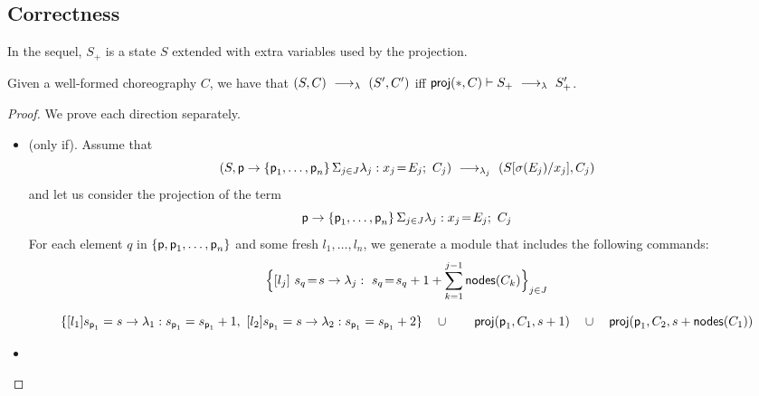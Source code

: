 



\subsection{Correctness}

In the sequel, $S_+$ is a state $S$ extended with extra variables used
by the projection.
\begin{theorem}[EPP]\label{thm:epp}
  Given a well-formed choreography $C$, we have that
  $(S,C) \ \longrightarrow_{\lambda}\  (S', C')$ iff
  $\mathsf{proj} (*, C)\vdash S_+\ \longrightarrow_{\lambda}\  S'_+$.
\end{theorem} 
\begin{proof} We prove each direction separately.
  \begin{itemize}
  \item (only if). Assume that
    $$(S, \textsf{p}\rightarrow \{\textsf{p}_1,\ldots,\textsf{p}_n\}\,\Sigma_{j\in J} \lambda_j: x_j\!=\!E_j;\ C_j)\ \longrightarrow_{\lambda_j}\ (S[\sigma(E_j)/x_j], C_j)$$
    and let us consider the projection of the term
    $$\textsf{p}\rightarrow \{\textsf{p}_1,\ldots,\textsf{p}_n\}\,\Sigma_{j\in J} \lambda_j: x_j\!=\!E_j;\ C_j$$
    For each element $q$ in $\{\textsf{p}, \textsf{p}_1,\ldots,\textsf{p}_n\}$
    and some fresh $l_1,\ldots, l_n$, we generate a module that
    includes the following commands:
    $$
    \Big\{[l_j] \ s_{q}\!=\! s \rightarrow \lambda_j:\ s_{q}\!=\!
      s_{q} +1+\sum_{k=1}^{j-1}\mathsf{nodes}({C_k})\Big\}_{j\in J}
    $$







    $$\{ 
    [l_1] s_{\textsf{p}_1} = s \rightarrow \lambda_1: s_{\textsf{p}_1} = s_{\textsf{p}_1} +1,\  
    [l_2] s_{\textsf{p}_1} = s \rightarrow \lambda_2: s_{\textsf{p}_1} = s_{\textsf{p}_1} +2  
    \}
    \quad\cup\\
    \qquad \mathsf{proj} (\textsf{p}_1, C_1, s+1)
    \quad\cup\quad
    \mathsf{proj} (\textsf{p}_1, C_2, s+\mathsf{nodes}(C_1))
    $$
  \item
  \end{itemize}
\end{proof}

